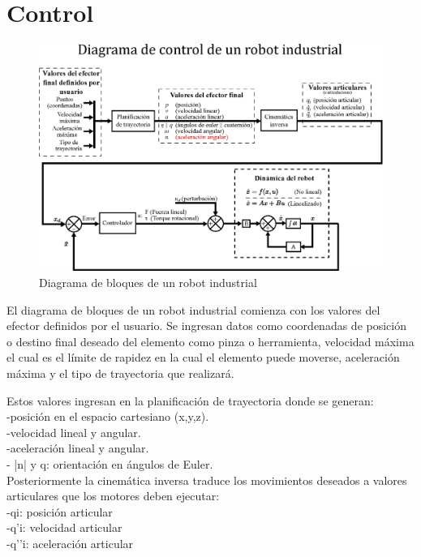 \section{Control}

\begin{figure}[h]
	\centering
	\includegraphics[width=\linewidth]{img/Diagrama_robot_industrial}
	\caption{Diagrama de bloques de un robot industrial}
	\label{fig:diagrama-de-robot-industrial}
\end{figure}

El diagrama de bloques de un robot industrial comienza con los valores del efector definidos por el usuario. Se ingresan datos como coordenadas de posición o destino final deseado del elemento como pinza o herramienta, velocidad máxima el cual es el límite de rapidez en la cual el elemento puede moverse, aceleración máxima y el tipo de trayectoria que realizará. 


Estos valores ingresan en la planificación de trayectoria donde se generan:\\[5pt]
-posición en el espacio cartesiano (x,y,z).\\[5pt]
-velocidad  lineal y angular.\\[5pt]
-aceleración lineal y angular.\\[5pt]
- |n| y q: orientación en ángulos de Euler.\\[5pt]


Posteriormente la cinemática inversa traduce los movimientos deseados a valores articulares que los motores deben ejecutar: \\[5pt]
-qi: posición articular\\[5pt]
-q’i: velocidad articular\\[5pt]
-q’’i: aceleración articular\\[5pt]


